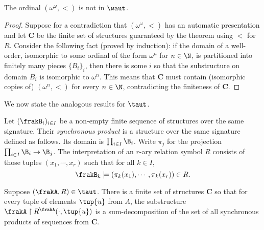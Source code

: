 \begin{corollary}  \label{cor:omegaomega}
The ordinal $(\omega^\omega,<)$ is not in $\waut$.
\end{corollary}

\begin{proof}
Suppose for a contradiction that $(\omega^\omega,<)$ has an automatic presentation and let $\mathbf{C}$ be the finite set of structures
guaranteed by the theorem using $<$ for $R$.
Consider the following fact (proved by induction): if the domain of a well-order,
isomorphic to some ordinal of the form $\omega^n$ for $n \in \N$, is
partitioned into finitely many pieces $\{B_i\}_i$, then there is some $i$ so
that the substructure on domain $B_i$ is isomorphic to $\omega^n$.
This means that $\mathbf{C}$ must contain (isomorphic copies of) $(\omega^n,<)$ for every $n \in \N$, contradicting
the finiteness of $\mathbf{C}$.
\end{proof}


We now state the analogous results for $\taut$.

\begin{definition}
Let $(\frakB_i)_{i \in I}$ be a non-empty finite sequence of structures over the same signature. Their {\em synchronous product} is a structure over the same signature 
defined as follows. Its domain is $\prod_{i \in I} \B_i$. Write $\pi_j$ for the projection $\prod_{i \in I} \B_i \to \B_j$. The interpretation of an $r$-ary relation symbol $R$
consists of those tuples $(x_1,\cdots,x_r)$ such that for all $k \in I$, 
\[
\frakB_k \models (\pi_k(x_1),\cdots,\pi_k(x_r)) \in R .%
\]
\end{definition}


\begin{theorem}
Suppose $(\frakA,R) \in \taut$.
There is a finite set of structures $\mathbf{C}$ so that for every tuple of elements $\tup{u}$ from $A$, the
substructure ${\frakA} \restriction R^{\frakA}(\cdot,\tup{u})$ is a sum-decomposition of the set
of all synchronous products of sequences from $\mathbf{C}$.
\end{theorem}

